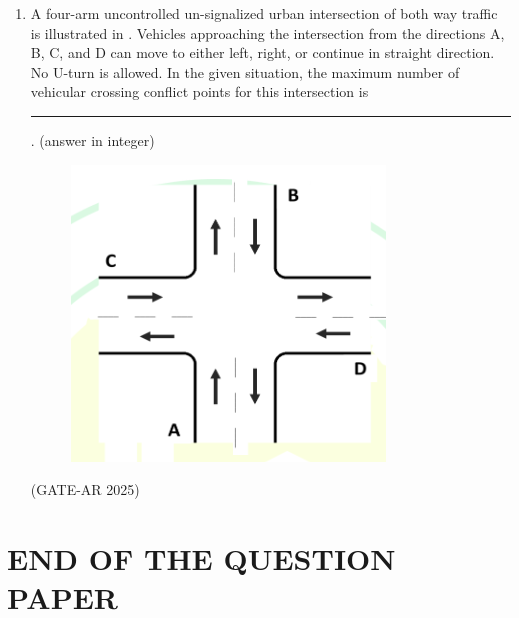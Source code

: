 \documentclass[a4paper,10pt]{article}
\begin{document}
\begin{enumerate}
    \item A four-arm uncontrolled un-signalized urban intersection of both way traffic is illustrated in . Vehicles approaching the intersection from the directions A, B, C, and D can move to either left, right, or continue in straight direction. No U-turn is allowed. In the given situation, the maximum number of vehicular crossing conflict points for this intersection is \rule{2cm}{0.4pt}. (answer in integer) \\
    \begin{figure}[h!]
    \centering
    \includegraphics[width=0.3\columnwidth]{figs/12.jpg}
    \caption{}
    \label{fig:Img12}
    \end{figure}
    \hfill (GATE-AR 2025)

\end{enumerate}

\centering
\section*{END OF THE QUESTION PAPER}
\end{document}
